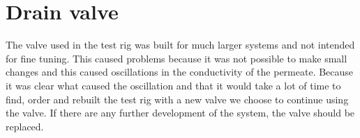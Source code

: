 \section{Drain valve}
The valve used in the test rig was built for much larger systems and not intended for fine tuning. This caused problems because it was not possible to make small changes and this caused oscillations in the conductivity of the permeate. Because it was clear what caused the oscillation and that it would take a lot of time to find, order and rebuilt the test rig with a new valve we choose to continue using the valve. If there are any further development of the system, the valve should be replaced.










